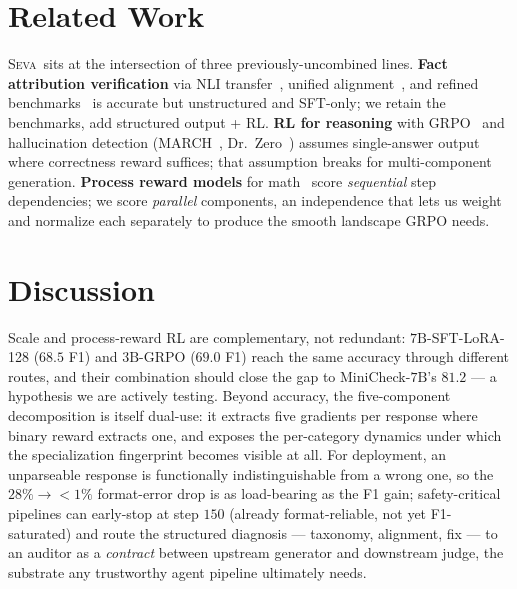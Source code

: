 \documentclass{article}
\newcommand{\seva}{\textsc{Seva}\xspace}
\begin{document}
\section{Related Work}
\label{sec:related}

\seva\ sits at the intersection of three previously-uncombined lines.
\textbf{Fact attribution verification} via NLI transfer~\citep{tang2024minicheck}, unified alignment~\citep{zha2023alignscore}, and refined benchmarks~\citep{seo2025vtv} is accurate but unstructured and SFT-only; we retain the benchmarks, add structured output + RL.
\textbf{RL for reasoning} with GRPO~\citep{shao2024deepseekmath,zha2025tango} and hallucination detection (MARCH~\citep{li2026march}, Dr.\ Zero~\citep{yue2026drzero}) assumes single-answer output where correctness reward suffices; that assumption breaks for multi-component generation.
\textbf{Process reward models} for math~\citep{lightman2024lets,wang2024mathshepherd} score \emph{sequential} step dependencies; we score \emph{parallel} components, an independence that lets us weight and normalize each separately to produce the smooth landscape GRPO needs.


\section{Discussion}
\label{sec:discussion}

Scale and process-reward RL are complementary, not redundant: $7\text{B}$-SFT-LoRA-128 ($68.5$ F1) and $3\text{B}$-GRPO ($69.0$ F1) reach the same accuracy through different routes, and their combination should close the gap to MiniCheck-$7\text{B}$'s $81.2$ --- a hypothesis we are actively testing.
Beyond accuracy, the five-component decomposition is itself dual-use: it extracts five gradients per response where binary reward extracts one, and exposes the per-category dynamics under which the specialization fingerprint becomes visible at all.
For deployment, an unparseable response is functionally indistinguishable from a wrong one, so the $28\%{\to}<\!1\%$ format-error drop is as load-bearing as the F1 gain; safety-critical pipelines can early-stop at step $150$ (already format-reliable, not yet F1-saturated) and route the structured diagnosis --- taxonomy, alignment, fix --- to an auditor as a \emph{contract} between upstream generator and downstream judge, the substrate any trustworthy agent pipeline ultimately needs.
\end{document}
